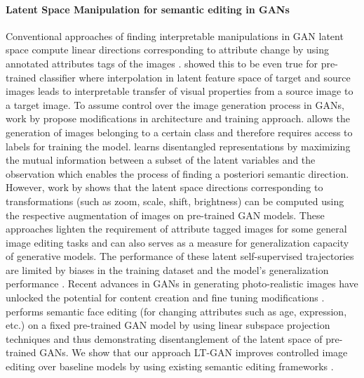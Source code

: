 \documentclass[10pt,twocolumn,letterpaper]{article}
\begin{document}
\paragraph{Latent Space Manipulation for semantic editing in GANs}
Conventional approaches of finding interpretable manipulations in GAN latent space compute linear directions corresponding to attribute change by using annotated attributes tags of the images \cite{dcgan2016radford, stylegan2019karras}. \cite{dfi2017upchurch} showed this to be even true for pre-trained classifier where interpolation in latent feature space of target and source images leads to interpretable transfer of visual properties from a source image to a target image. To assume control over the image generation process in GANs, work by \cite{condgan2017odena,infogan2016} propose modifications in architecture and training approach. \cite{condgan2017odena} allows the generation of images belonging to a certain class and therefore requires access to labels for training the model. \cite{infogan2016} learns disentangled representations by maximizing the mutual information between a subset of the latent variables and the observation which enables the process of finding a posteriori semantic direction. However, work by \cite{gansteerability, controlling2020iclr, ganalyze2019isola} shows that the latent space directions corresponding to transformations (such as zoom, scale, shift, brightness) can be computed using the respective augmentation of images on pre-trained GAN models. These approaches \cite{gansteerability, controlling2020iclr} lighten the requirement of attribute tagged images for some general image editing tasks and can also serves as a measure for generalization capacity of generative models. The performance of these latent self-supervised trajectories are limited by biases in the training dataset and the model's generalization performance \cite{denton2019bias, gansteerability}. Recent advances in GANs \cite{biggan2018brock,stylegan2019karras} in generating photo-realistic images have unlocked the potential for content creation and fine tuning modifications \cite{zhu2016finetune,zhu2019finetune}. \cite{interface2020shen} performs semantic face editing (for changing attributes such as age, expression, etc.) on a fixed pre-trained GAN model by using linear subspace projection techniques and thus demonstrating disentanglement of the latent space of pre-trained GANs. We show that our approach LT-GAN improves controlled image editing over baseline models by using existing semantic editing frameworks \cite{interface2020shen,controlling2020iclr}.
\end{document}
